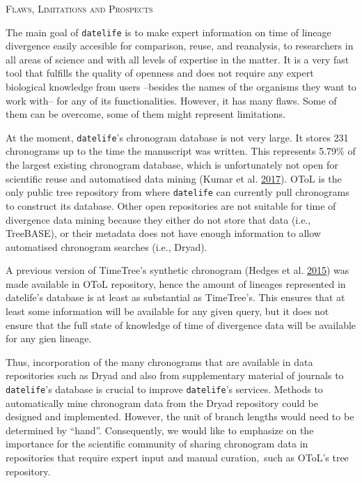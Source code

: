 \documentclass[]{article}
\begin{document}
\begin{center}
\textsc{Flaws, Limitations and Prospects}
\end{center}

The main goal of \texttt{datelife} is to make expert information on time of lineage divergence easily accesible for comparison, reuse, and reanalysis, to researchers in all areas of science and with all levels of expertise in the matter. It is a very fast tool that fulfills the quality of openness and does not require any expert biological knowledge from users --besides the names of the organisms they want to work with-- for any of its functionalities. However, it has many flaws. Some of them can be overcome, some of them might represent limitations.

At the moment, \texttt{datelife}'s chronogram database is not very large. It stores 231 chronograms up to the time the manuscript was written. This represents 5.79\% of the largest existing chronogram database, which is unfortunately not open for scientific reuse and automatised data mining (Kumar et al. \protect\hyperlink{ref-Kumar2017}{2017}). OToL is the only public tree repository from where \texttt{datelife} can currently pull chronograms to construct its database. Other open repositories are not suitable for time of divergence data mining because they either do not store that data (i.e., TreeBASE), or their metadata does not have enough information to allow automatised chronogram searches (i.e., Dryad).

A previous version of TimeTree's synthetic chronogram (Hedges et al. \protect\hyperlink{ref-Hedges2015}{2015}) was made available in OToL repository, hence the amount of lineages represented in datelife's database is at least as substantial as TimeTree's.
This ensures that at least some information will be available for any given query, but it does not ensure that the full state of knowledge of time of divergence data will be available for any gien lineage.

Thus, incorporation of the many chronograms that are available in data repositories such as Dryad and also from supplementary material of journals to \texttt{datelife}'s database is crucial to improve \texttt{datelife}'s services.
Methods to automatically mine chronogram data from the Dryad repository could be designed and implemented. However, the unit of branch lengths would need to be determined by ``hand''.
Consequently, we would like to emphasize on the importance for the scientific community of sharing chronogram data in repositories that require expert input and manual curation,~such as OToL's tree repository.
\end{document}
